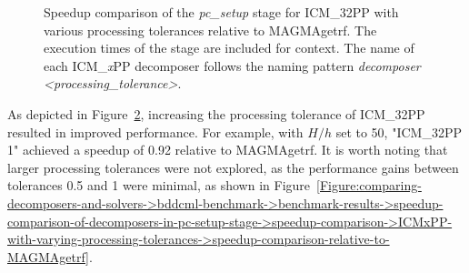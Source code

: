 \begin{figure}[ht!]
\begin{subfigure}{\textwidth}
		\label{Figure:comparing-decomposers-and-solvers->bddcml-benchmark->benchmark-results->speedup-comparison-of-decomposers-in-pc-setup-stage->speedup-comparison->ICMxPP-with-varying-processing-tolerances->pc-setup-time-with-MAGMAgetrf}
	\end{subfigure}
	\caption{Speedup comparison of the \textit{pc\_setup} stage for ICM\_32PP with various processing tolerances relative to MAGMAgetrf.
		The execution times of the stage are included for context.
		The name of each ICM\_\textit{x}PP decomposer follows the naming pattern \textit{decomposer <processing\_tolerance>}.
	}
	\label{Figure:comparing-decomposers-and-solvers->bddcml-benchmark->benchmark-results->speedup-comparison-of-decomposers-in-pc-setup-stage->speedup-comparison->ICMxPP-with-varying-processing-tolerances->speedup-comparison-relative-to-MAGMAgetrf-and-pc-setup-execution-time}
\end{figure}

As depicted in Figure~\ref{Figure:comparing-decomposers-and-solvers->bddcml-benchmark->benchmark-results->speedup-comparison-of-decomposers-in-pc-setup-stage->speedup-comparison->ICMxPP-with-varying-processing-tolerances->speedup-comparison-relative-to-MAGMAgetrf-and-pc-setup-execution-time}, increasing the processing tolerance of ICM\_32PP resulted in  improved performance.
For example, with $H/h$ set to 50, "ICM\_32PP 1" achieved a speedup of 0.92 relative to MAGMAgetrf.
It is worth noting that larger processing tolerances were not explored, as the performance gains between tolerances 0.5 and 1 were minimal, as shown in Figure~\ref{Figure:comparing-decomposers-and-solvers->bddcml-benchmark->benchmark-results->speedup-comparison-of-decomposers-in-pc-setup-stage->speedup-comparison->ICMxPP-with-varying-processing-tolerances->speedup-comparison-relative-to-MAGMAgetrf}.

